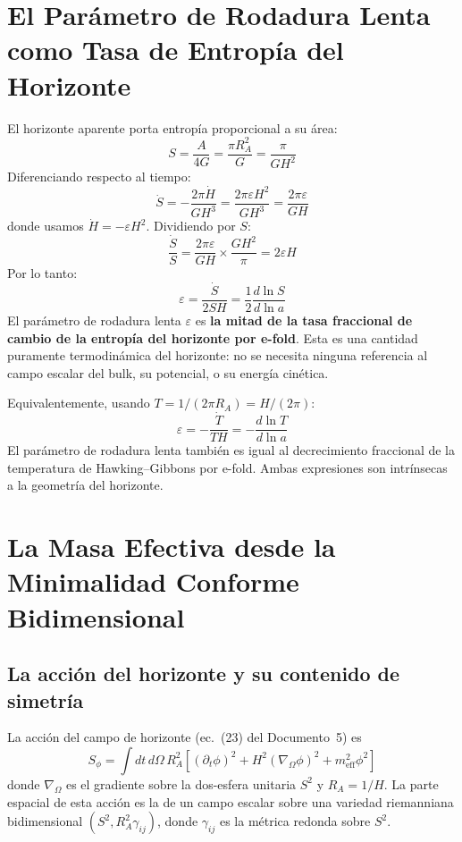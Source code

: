 \documentclass[12pt,a4paper]{article}
\begin{document}
\section{El Parámetro de Rodadura Lenta como Tasa de Entropía del Horizonte}

El horizonte aparente porta entropía proporcional a su área:
\begin{equation}
S = \frac{A}{4G} = \frac{\pi R_A^2}{G} = \frac{\pi}{G H^2} \tag{3}
\end{equation}
Diferenciando respecto al tiempo:
\begin{equation}
\dot{S} = -\frac{2\pi \dot{H}}{G H^3} = \frac{2\pi \varepsilon H^2}{G H^3} = \frac{2\pi \varepsilon}{G H} \tag{4}
\end{equation}
donde usamos $\dot{H} = -\varepsilon H^2$. Dividiendo por $S$:
\begin{equation}
\frac{\dot{S}}{S} = \frac{2\pi\varepsilon}{GH} \times \frac{GH^2}{\pi} = 2\varepsilon H \tag{5}
\end{equation}
Por lo tanto:
\begin{equation}
\varepsilon = \frac{\dot{S}}{2SH} = \frac{1}{2}\frac{d\ln S}{d\ln a} \tag{6}
\end{equation}
El parámetro de rodadura lenta $\varepsilon$ es \textbf{la mitad de la tasa fraccional de cambio de la entropía del horizonte por e-fold}. Esta es una cantidad puramente termodinámica del horizonte: no se necesita ninguna referencia al campo escalar del bulk, su potencial, o su energía cinética.

Equivalentemente, usando $T = 1/(2\pi R_A) = H/(2\pi)$:
\begin{equation}
\varepsilon = -\frac{\dot{T}}{TH} = -\frac{d\ln T}{d\ln a} \tag{7}
\end{equation}
El parámetro de rodadura lenta también es igual al decrecimiento fraccional de la temperatura de Hawking--Gibbons por e-fold. Ambas expresiones son intrínsecas a la geometría del horizonte.

\section{La Masa Efectiva desde la Minimalidad Conforme Bidimensional}

\subsection{La acción del horizonte y su contenido de simetría}

La acción del campo de horizonte (ec.~(23) del Documento~5) es
\begin{equation}
S_\phi = \int dt\, d\Omega\, R_A^2 \left[(\partial_t\phi)^2 + H^2(\nabla_\Omega\phi)^2 + m_\text{eff}^2\phi^2\right] \tag{8}
\end{equation}
donde $\nabla_\Omega$ es el gradiente sobre la dos-esfera unitaria $S^2$ y $R_A = 1/H$. La parte espacial de esta acción es la de un campo escalar sobre una variedad riemanniana bidimensional $(S^2, R_A^2 \gamma_{ij})$, donde $\gamma_{ij}$ es la métrica redonda sobre $S^2$.
\end{document}
